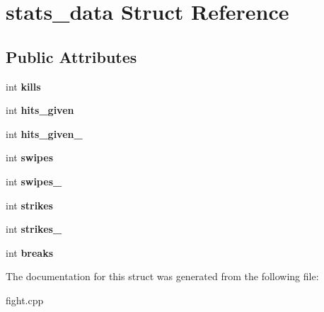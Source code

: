 \hypertarget{structstats__data}{\section{stats\-\_\-data Struct Reference}
\label{structstats__data}
}
\subsection*{Public Attributes}
\begin{DoxyCompactItemize}
\item 
\hypertarget{structstats__data_ae7d08d0a27b0f33fb890d176d7695335}{int {\bfseries kills}}\label{structstats__data_ae7d08d0a27b0f33fb890d176d7695335}

\item 
\hypertarget{structstats__data_a63149070bb61d1c3301b6036d7438eba}{int {\bfseries hits\-\_\-given}}\label{structstats__data_a63149070bb61d1c3301b6036d7438eba}

\item 
\hypertarget{structstats__data_ac25231cdd786a1a31342a629cb3aa460}{int {\bfseries hits\-\_\-given\-\_}}\label{structstats__data_ac25231cdd786a1a31342a629cb3aa460}

\item 
\hypertarget{structstats__data_ad13f4120ba1a3d28801e61aad8a72c5b}{int {\bfseries swipes}}\label{structstats__data_ad13f4120ba1a3d28801e61aad8a72c5b}

\item 
\hypertarget{structstats__data_a396ace92f63db8810d0b3a72752cfefe}{int {\bfseries swipes\-\_}}\label{structstats__data_a396ace92f63db8810d0b3a72752cfefe}

\item 
\hypertarget{structstats__data_a33514667c573932f9f532a05c9e465b7}{int {\bfseries strikes}}\label{structstats__data_a33514667c573932f9f532a05c9e465b7}

\item 
\hypertarget{structstats__data_adfafae05b4eb951648472534b2ae6415}{int {\bfseries strikes\-\_}}\label{structstats__data_adfafae05b4eb951648472534b2ae6415}

\item 
\hypertarget{structstats__data_a5d0d327b625586d49304613246db3c4e}{int {\bfseries breaks}}\label{structstats__data_a5d0d327b625586d49304613246db3c4e}

\end{DoxyCompactItemize}


The documentation for this struct was generated from the following file\-:\begin{DoxyCompactItemize}
\item 
fight.\-cpp\end{DoxyCompactItemize}

